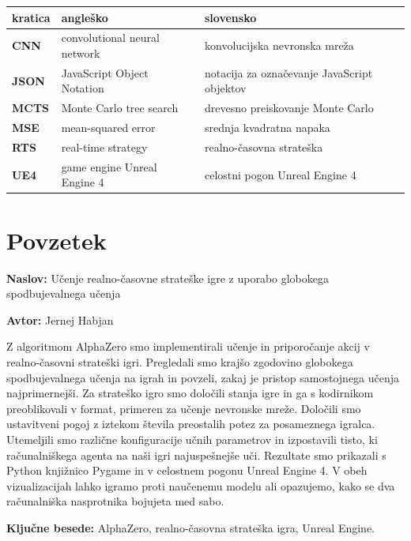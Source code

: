 \documentclass[a4paper, 12pt]{book}
\newcommand{\ttitle}{Učenje realno-časovne strateške igre z uporabo globokega spodbujevalnega učenja}
\newcommand{\tauthor}{Jernej Habjan}
\newcommand{\tkeywords}{AlphaZero, realno-časovna strateška igra, Unreal Engine}
\newcommand{\clearemptydoublepage}{\newpage{\pagestyle{empty}\cleardoublepage}}
\begin{document}
\noindent\begin{tabular}{p{}|p{}|p{}}    %
	{\bf kratica} & {\bf angleško} & {\bf slovensko} \\ \hline
	{\bf CNN}  & convolutional neural network & konvolucijska nevronska mreža \\
	{\bf JSON} & JavaScript Object Notation & notacija za označevanje JavaScript objektov \\
	{\bf MCTS} & Monte Carlo tree search & drevesno preiskovanje Monte Carlo \\
	{\bf MSE}  & mean-squared error & srednja kvadratna napaka \\
	{\bf RTS}  & real-time strategy & realno-časovna strateška\\
	{\bf UE4}  & game engine Unreal Engine 4 & celostni pogon Unreal Engine 4 \\
\end{tabular}


\clearemptydoublepage

\chapter*{Povzetek}

\noindent\textbf{Naslov:} \ttitle
\bigskip

\noindent\textbf{Avtor:} \tauthor
\bigskip

\noindent 
Z algoritmom AlphaZero smo implementirali učenje in priporočanje akcij v realno-časovni strateški igri.
Pregledali smo krajšo zgodovino globokega spodbujevalnega učenja na igrah in povzeli, zakaj je pristop samostojnega učenja najprimernejši.
Za strateško igro smo določili stanja igre in ga s kodirnikom preoblikovali v format, primeren za učenje nevronske mreže.
Določili smo ustavitveni pogoj z iztekom števila preostalih potez za posameznega igralca.
Utemeljili smo različne konfiguracije učnih parametrov in izpostavili tisto, ki računalniškega agenta na naši igri najuspešnejše uči.
Rezultate smo prikazali s Python knjižnico Pygame in v celostnem pogonu Unreal Engine 4. 
V obeh vizualizacijah lahko igramo proti naučenemu modelu ali opazujemo, kako se dva računalniška nasprotnika bojujeta med sabo.
\bigskip

\noindent\textbf{Ključne besede:} \tkeywords.
\clearemptydoublepage
\end{document}
